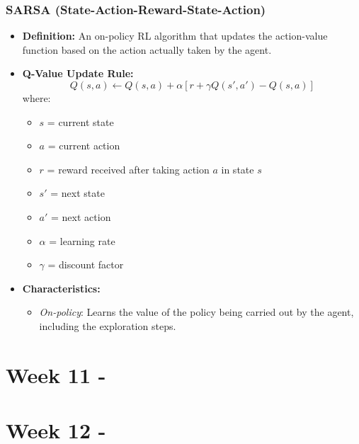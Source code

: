 \documentclass[8pt]{article}
\begin{document}
\subsubsection*{SARSA (State-Action-Reward-State-Action)}
\begin{itemize}
    \item \textbf{Definition:} An on-policy RL algorithm that updates the action-value function based on the action actually taken by the agent.
    \item \textbf{Q-Value Update Rule:}
    \[
    Q(s, a) \leftarrow Q(s, a) + \alpha \left[ r + \gamma Q(s', a') - Q(s, a) \right]
    \]
    where:
    \begin{itemize}
        \item \( s \) = current state
        \item \( a \) = current action
        \item \( r \) = reward received after taking action \( a \) in state \( s \)
        \item \( s' \) = next state
        \item \( a' \) = next action
        \item \( \alpha \) = learning rate
        \item \( \gamma \) = discount factor
    \end{itemize}
    \item \textbf{Characteristics:}
    \begin{itemize}
        \item \textit{On-policy}: Learns the value of the policy being carried out by the agent, including the exploration steps.
    \end{itemize}
\end{itemize}

\newpage
\section{Week 11 - }

\newpage
\section{Week 12 - }
\end{document}
